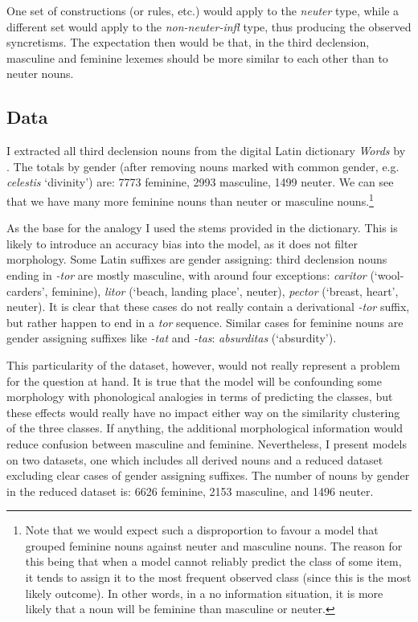 One set of constructions (or rules, etc.) would apply to the \textit{neuter} type, while a different set would apply to the \textit{non-neuter-infl} type, thus producing the observed syncretisms. The expectation then would be that, in the third declension, masculine and feminine lexemes should be more similar to each other than to neuter nouns.

\subsection{Data}

I extracted all third declension nouns from the digital Latin dictionary \textit{Words} by \textcite{Whitaker.}. The totals by gender (after removing nouns marked with common gender, e.g. \textit{celestis} `divinity') are: 7773 feminine, 2993 masculine, 1499 neuter. We can see that we have many more feminine nouns than neuter or masculine nouns.\footnote{Note that we would expect such a disproportion to favour a model that grouped feminine nouns against neuter and masculine nouns. The reason for this being that when a model cannot reliably predict the class of some item, it tends to assign it to the most frequent observed class (since this is the most likely outcome). In other words, in a no information situation, it is more likely that a noun will be feminine than masculine or neuter.}

As the base for the analogy I used the stems provided in the dictionary. This is likely to introduce an accuracy bias into the model, as it does not filter morphology. Some Latin suffixes are gender assigning: third declension nouns ending in \textit{-tor} are mostly masculine, with around four exceptions: \textit{caritor} (`wool-carders', feminine), \textit{litor} (`beach, landing place', neuter),  \textit{pector} (`breast, heart', neuter). It is clear that these cases do not really contain a derivational \textit{-tor} suffix, but rather happen to end in a \textit{tor} sequence. Similar cases for feminine nouns are gender assigning suffixes like \textit{-tat} and \textit{-tas}: \textit{absurditas} (`absurdity').

This particularity of the dataset, however, would not really represent a problem for the question at hand. It is true that the model will be confounding some morphology with phonological analogies in terms of predicting the classes, but these effects would really have no impact either way on the similarity clustering of the three classes. If anything, the additional morphological information would reduce confusion between masculine and feminine. Nevertheless, I present models on two datasets, one which includes all derived nouns and a reduced dataset excluding clear cases of gender assigning suffixes. The number of nouns by gender in the reduced dataset is: 6626 feminine, 2153 masculine, and 1496 neuter.


